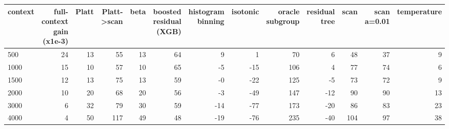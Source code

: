 \begin{tabular}{lrrrrrrrrrrrr}
\toprule
context & full-context gain (x1e-3) & Platt & Platt->scan & beta & boosted residual (XGB) & histogram binning & isotonic & oracle subgroup & residual tree & scan & scan a=0.01 & temperature \\
\midrule
500 & 24 & 13 & 55 & 13 & 64 & 9 & 1 & 70 & 6 & 48 & 37 & 9 \\
1000 & 15 & 10 & 57 & 10 & 65 & -5 & -15 & 106 & 4 & 77 & 74 & 6 \\
1500 & 12 & 13 & 75 & 13 & 59 & -0 & -22 & 125 & -5 & 73 & 72 & 9 \\
2000 & 10 & 20 & 68 & 20 & 56 & -3 & -49 & 147 & -12 & 90 & 90 & 13 \\
3000 & 6 & 32 & 79 & 30 & 59 & -14 & -77 & 173 & -20 & 86 & 83 & 23 \\
4000 & 4 & 50 & 117 & 49 & 48 & -19 & -76 & 235 & -40 & 104 & 97 & 38 \\
\bottomrule
\end{tabular}

